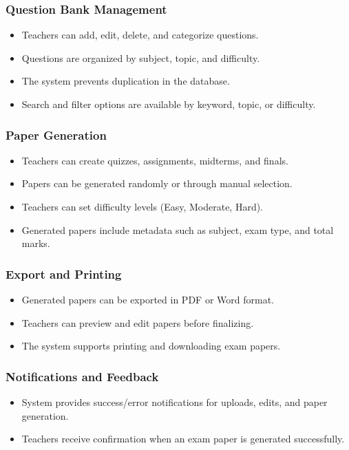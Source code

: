 \documentclass[12pt]{article}
\begin{document}
	\subsubsection{Question Bank Management}
	\begin{itemize}
		\item Teachers can add, edit, delete, and categorize questions.
		\item Questions are organized by subject, topic, and difficulty.
		\item The system prevents duplication in the database.
		\item Search and filter options are available by keyword, topic, or difficulty.
	\end{itemize}
	
	\subsubsection{Paper Generation}
	\begin{itemize}
		\item Teachers can create quizzes, assignments, midterms, and finals.
		\item Papers can be generated randomly or through manual selection.
		\item Teachers can set difficulty levels (Easy, Moderate, Hard).
		\item Generated papers include metadata such as subject, exam type, and total marks.
	\end{itemize}
	
	\subsubsection{Export and Printing}
	\begin{itemize}
		\item Generated papers can be exported in PDF or Word format.
		\item Teachers can preview and edit papers before finalizing.
		\item The system supports printing and downloading exam papers.
	\end{itemize}
	
	\subsubsection{Notifications and Feedback}
	\begin{itemize}
		\item System provides success/error notifications for uploads, edits, and paper generation.
		\item Teachers receive confirmation when an exam paper is generated successfully.
	\end{itemize}
	
\end{document}
